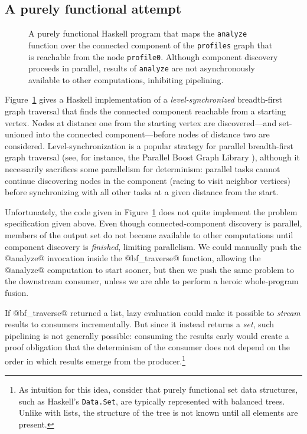 \subsection{A purely functional attempt}

\begin{figure}
  
  \caption{\footnotesize A purely functional Haskell program that maps
    the \lstinline|analyze| function over the connected component of
    the \lstinline|profiles| graph that is reachable from the node
    \lstinline|profile0|.  Although component discovery proceeds in
    parallel, results of \lstinline|analyze| are not asynchronously
    available to other computations, inhibiting pipelining.}
  \label{f:bfs-pure}
\end{figure}

Figure~\ref{f:bfs-pure} gives a Haskell implementation of a
\emph{level-synchronized} breadth-first graph traversal that finds the
connected component reachable from a starting vertex.  Nodes at
distance one from the starting vertex are discovered---and set-unioned
into the connected component---before nodes of distance two are
considered.  Level-synchronization is a popular strategy for parallel
breadth-first graph traversal (see, for instance, the Parallel Boost
Graph Library \cite{bfs-pbgl}), although it necessarily sacrifices
some parallelism for determinism: parallel tasks cannot continue
discovering nodes in the component (racing to visit neighbor vertices)
before synchronizing with all other tasks at a given distance from the
start.

Unfortunately, the code given in Figure~\ref{f:bfs-pure} does not
quite implement the problem specification given above.  Even though
connected-component discovery is parallel, members of the output set
do not become available to other computations until component
discovery is \emph{finished}, limiting parallelism.  We could manually
push the @analyze@ invocation inside the @bf_traverse@ function,
allowing the @analyze@ computation to start sooner, but then we push
the same problem to the downstream consumer, unless we are able to
perform a heroic whole-program fusion.  

If @bf_traverse@ returned a list, lazy evaluation could make it
possible to \emph{stream} results to consumers incrementally.  But
since it instead returns a \emph{set}, such pipelining is not
generally possible: consuming the results early would create a proof
obligation that the determinism of the consumer does not depend on the
order in which results emerge from the producer.\footnote{As intuition
  for this idea, consider that purely functional set data structures,
  such as Haskell's \lstinline|Data.Set|, are typically represented
  with balanced trees.  Unlike with lists, the structure of the tree
  is not known until all elements are present.}

